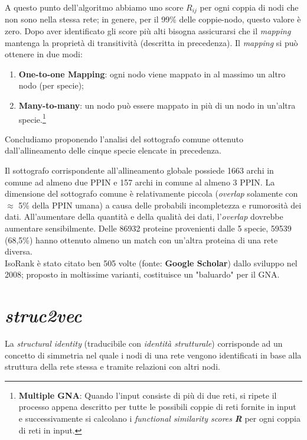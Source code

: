 \documentclass[11pt]{article}
\begin{document}
A questo punto dell'algoritmo abbiamo uno score $R_{ij}$ per ogni coppia di nodi che non sono nella stessa rete; in genere, per il 99\% delle coppie-nodo, questo valore è zero. Dopo aver identificato gli score più alti bisogna assicurarsi che il \textit{mapping} mantenga la proprietà di transitività (descritta in precedenza). Il \textit{mapping} si può ottenere in due modi: 
\begin{enumerate}
\setlength{\itemsep}{1pt}
  \setlength{\parskip}{0pt}
  \setlength{\parsep}{0pt}
\item \textbf{One-to-one Mapping}: ogni nodo viene mappato in al massimo un altro nodo (per specie);
\item \textbf{Many-to-many}: un nodo può essere mappato in più di un nodo in un'altra specie.\footnote{\textbf{Multiple GNA}: Quando l'input consiste di più di due reti, si ripete il processo appena descritto per tutte le possibili coppie di reti fornite in input e successivamente si calcolano i \textit{functional similarity scores} \textit{\textbf{R}} per ogni coppia di reti in input.}
\end{enumerate}

Concludiamo proponendo l'analisi del sottografo comune ottenuto dall'allineamento delle cinque specie elencate in precedenza.

Il sottografo corrispondente all'allineamento globale possiede 1663 archi in comune ad almeno due PPIN e 157 archi in comune al almeno 3 PPIN. La dimensione del sottografo comune è relativamente piccola (\textit{overlap} solamente con $\approx$ 5\% della PPIN umana) a causa delle probabili incompletezza e rumorosità dei dati. All'aumentare della quantità e della qualità dei dati, l'\textit{overlap} dovrebbe aumentare sensibilmente. Delle 86932 proteine provenienti dalle 5 specie, 59539 (68,5\%) hanno ottenuto almeno un match con un'altra proteina di una rete diversa.\\

IsoRank è stato citato ben 505 volte (fonte: \textbf{Google Scholar}) dallo sviluppo nel 2008; proposto in moltissime varianti, costituisce un "baluardo" per il GNA.

\pagebreak
\section{\textit{struc2vec}}
La \textit{structural identity} (traducibile con \textit{identità strutturale}) corrisponde ad un concetto di simmetria nel quale i nodi di una rete vengono identificati in base alla struttura della rete stessa e tramite relazioni con altri nodi. \\
\end{document}
